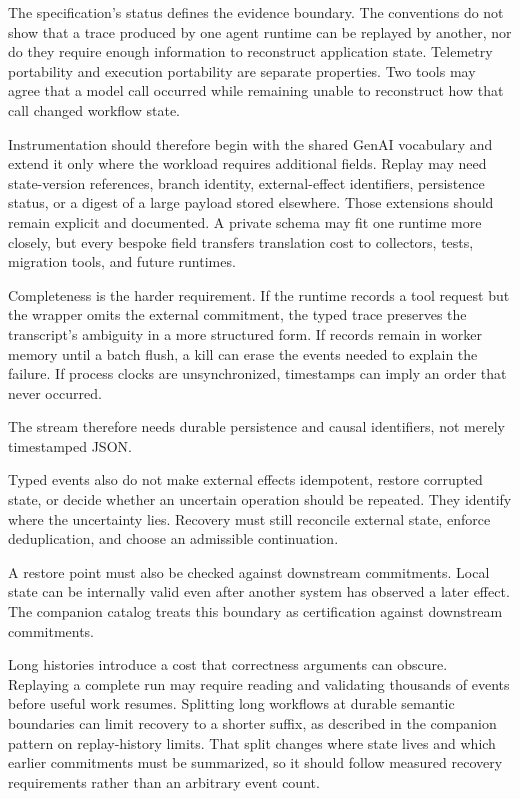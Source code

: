 The specification's status defines the evidence boundary. The conventions do not show that a trace produced by one agent runtime can be replayed by another, nor do they require enough information to reconstruct application state. Telemetry portability and execution portability are separate properties. Two tools may agree that a model call occurred while remaining unable to reconstruct how that call changed workflow state.

Instrumentation should therefore begin with the shared GenAI vocabulary and extend it only where the workload requires additional fields. Replay may need state-version references, branch identity, external-effect identifiers, persistence status, or a digest of a large payload stored elsewhere. Those extensions should remain explicit and documented. A private schema may fit one runtime more closely, but every bespoke field transfers translation cost to collectors, tests, migration tools, and future runtimes.

Completeness is the harder requirement. If the runtime records a tool request but the wrapper omits the external commitment, the typed trace preserves the transcript's ambiguity in a more structured form. If records remain in worker memory until a batch flush, a kill can erase the events needed to explain the failure. If process clocks are unsynchronized, timestamps can imply an order that never occurred.

The stream therefore needs durable persistence and causal identifiers, not merely timestamped JSON.

Typed events also do not make external effects idempotent, restore corrupted state, or decide whether an uncertain operation should be repeated. They identify where the uncertainty lies. Recovery must still reconcile external state, enforce deduplication, and choose an admissible continuation.

A restore point must also be checked against downstream commitments. Local state can be internally valid even after another system has observed a later effect. The companion catalog treats this boundary as certification against downstream commitments.

Long histories introduce a cost that correctness arguments can obscure. Replaying a complete run may require reading and validating thousands of events before useful work resumes. Splitting long workflows at durable semantic boundaries can limit recovery to a shorter suffix, as described in the companion pattern on replay-history limits. That split changes where state lives and which earlier commitments must be summarized, so it should follow measured recovery requirements rather than an arbitrary event count.

